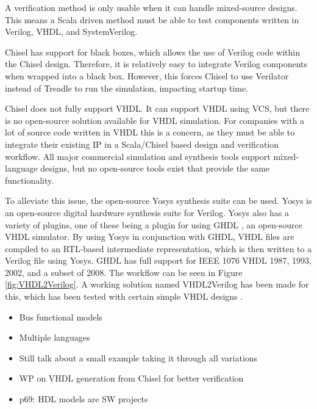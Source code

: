 \documentclass[conference]{IEEEtran}
\begin{document}
A verification method is only usable when it can handle mixed-source designs.
This means a Scala driven method must be able to test components written in Verilog,
VHDL, and SystemVerilog.

Chisel has support for black boxes, which allows the use of Verilog code within the Chisel design.
Therefore, it is relatively easy to integrate Verilog components when wrapped into a black box.
However, this forces Chisel to use Verilator instead of Treadle to run the simulation, impacting
startup time.

Chisel does not fully support VHDL. It can support VHDL using VCS, but there is no
open-source solution available for VHDL simulation. For companies with a lot of source code written in VHDL this is a concern, as they must be able to integrate their existing IP in a Scala/Chisel based design and verification workflow.
All major commercial simulation and synthesis tools support mixed-language designs, but no open-source tools exist that provide the same functionality.

To alleviate this issue, the open-source Yosys synthesis suite \cite{Yosys} can be used. Yosys is an open-source digital hardware synthesis suite for Verilog. Yosys also has a variety of plugins, one of these being a plugin for using GHDL \cite{ghdl}, an open-source VHDL simulator. By using Yosys in conjunction with GHDL, VHDL files are compiled to an RTL-based intermediate representation, which is then written to a Verilog file using Yosys. GHDL has full support for IEEE 1076 VHDL 1987, 1993, 2002, and a subset of 2008. The workflow can be seen in Figure \ref{fig:VHDL2Verilog}. A working solution named VHDL2Verilog has been made for this, which has been tested with certain simple VHDL designs \cite{vhdl2verilog}.



\begin{itemize}
\item Bus functional models
\item Multiple languages
\item Still talk about a small example taking it through all variations
\item WP on VHDL generation from Chisel for better verification
\item p69: HDL models are SW projects
\end{itemize}
\end{document}
